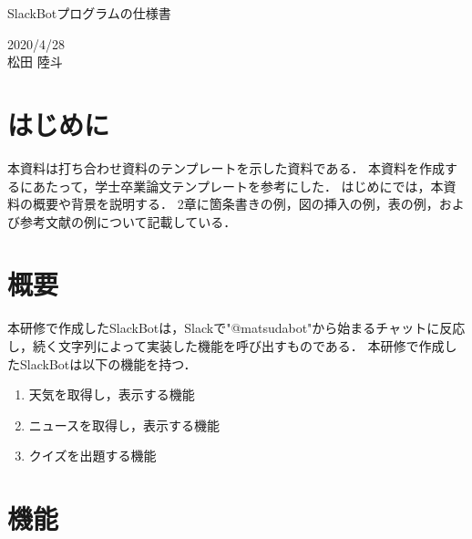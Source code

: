 \documentclass[12pt]{jsarticle}
\begin{document}
\begin{center}
{\LARGE SlackBotプログラムの仕様書}
\end{center}

\begin{flushright}
  2020/4/28\\
  松田 陸斗
\end{flushright}
\section{はじめに}
\label{sec:introduction}
本資料は打ち合わせ資料のテンプレートを示した資料である．
本資料を作成するにあたって，学士卒業論文テンプレートを参考にした．
はじめにでは，本資料の概要や背景を説明する．
2章に箇条書きの例，図の挿入の例，表の例，および参考文献の例について記載している．

\section{概要}
本研修で作成したSlackBotは，Slackで"@matsudabot"から始まるチャットに反応し，続く文字列によって実装した機能を呼び出すものである．
本研修で作成したSlackBotは以下の機能を持つ．
\begin{enumerate}
\item 天気を取得し，表示する機能
\item ニュースを取得し，表示する機能
\item クイズを出題する機能
\end{enumerate}


\section{機能}
\end{document}
